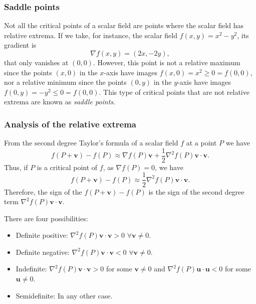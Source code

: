 \begin{frame}
\frametitle{Saddle points}
Not all the critical points of a scalar field are points where the scalar field has relative extrema. 
If we take, for instance, the scalar field $f(x,y)=x^2-y^2$, its gradient is 
\[
\nabla f(x,y) = (2x,-2y),
\]
that only vanishes at $(0,0)$.
However, this point is not a relative maximum since the points $(x,0)$ in the $x$-axis have images $f(x,0)=x^2\geq
0=f(0,0)$, nor a relative minimum since the points $(0,y)$ in the $y$-axis have images $f(0,y)=-y^2\leq
0=f(0,0)$. 
This type of critical points that are not relative extrema are known as \emph{saddle points}.
\begin{center}

\end{center}
\end{frame}


\begin{frame}
\frametitle{Analysis of the relative extrema}
From the second degree Taylor's formula of a scalar field $f$ at a point $P$ we have 
\[
f(P+\mathbf{v})-f(P)\approx \nabla f(P)\mathbf{v}+\frac{1}{2}\nabla^2f(P)\mathbf{v}\cdot\mathbf{v}.
\]
Thus, if $P$ is a critical point of $f$, as $\nabla f(P)=0$, we have
\[
f(P+\mathbf{v})-f(P)\approx \frac{1}{2}\nabla^2f(P)\mathbf{v}\cdot\mathbf{v}.
\]
Therefore, the sign of the $f(P+\mathbf{v})-f(P)$ is the sign of the second degree term $\nabla^2f(P)\mathbf{v}\cdot\mathbf{v}$.

There are four possibilities:
\begin{itemize}
\item Definite positive: $\nabla^2f(P)\mathbf{v}\cdot\mathbf{v}>0$ $\forall \mathbf{v}\neq 0$.
\item Definite negative: $\nabla^2f(P)\mathbf{v}\cdot\mathbf{v}<0$ $\forall \mathbf{v}\neq 0$.
\item Indefinite: $\nabla^2f(P)\mathbf{v}\cdot\mathbf{v}>0$ for some $\mathbf{v}\neq 0$ and $\nabla^2f(P)\mathbf{u}\cdot\mathbf{u}<0$ for some $\mathbf{u}\neq 0$.
\item Semidefinite: In any other case. 
\end{itemize}
\end{frame}


